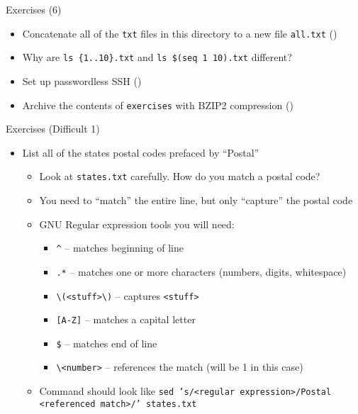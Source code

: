 \documentclass[hyperref={pdfpagelabels=false},12pt]{beamer}
\newcommand{\mybutton}[2]{\hyperlink{#1}{\beamerbutton{{#2}}}}
\begin{document}
\begin{frame}[label=exercises-6]{Exercises (6)}
\begin{itemize}
    \item Concatenate all of the \texttt{txt} files in this directory to a new file \texttt{all.txt} (\mybutton{cut-and-paste}{hint})
    \item Why are \texttt{ls \{1..10\}.txt} and \texttt{ls \$(seq 1 10).txt} different?
    \item Set up passwordless SSH (\mybutton{ssh}{hint})
    \item Archive the contents of \texttt{exercises} with BZIP2 compression (\mybutton{compression}{hint})
\end{itemize}
\end{frame}

\begin{frame}{Exercises (Difficult 1)}
\begin{itemize}
    \item List all of the states postal codes prefaced by ``Postal''
    \begin{itemize}
        \item Look at \texttt{states.txt} carefully. How do you match a postal code?
        \item You need to ``match'' the entire line, but only ``capture'' the postal code
        \item GNU Regular expression tools you will need:
        \begin{itemize}
           \item \texttt{\^{}} -- matches beginning of line
           \item \texttt{.*} -- matches one or more characters (numbers, digits, whitespace)
           \item \texttt{\textbackslash(<stuff>\textbackslash)} -- captures \texttt{<stuff>}
           \item \texttt{[A-Z]} -- matches a capital letter
           \item \texttt{\$} -- matches end of line
           \item \texttt{\textbackslash<number>} -- references the match (will be 1 in this case)
        \end{itemize}
        \item Command should look like \texttt{sed 's/<regular expression>/Postal <referenced match>/' states.txt}
    \end{itemize}
\end{itemize}
\end{frame}
\end{document}
